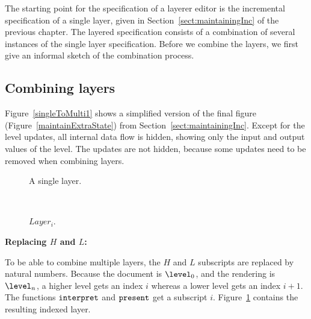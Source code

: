 The starting point for the specification of a layerer editor is the incremental specification of a single layer, given in Section~\ref{sect:maintainingInc} of the previous chapter. The layered specification consists of a combination of several instances of the single layer specification. Before we combine the layers, we first give an informal sketch of the combination process.

\subsection{Combining layers}

Figure~\ref{singleToMulti1} shows a simplified version of the final figure (Figure~\ref{maintainExtraState}) from Section~\ref{sect:maintainingInc}. Except for the level updates, all internal data flow is hidden, showing only the input and output values of the level. The updates are not hidden, because some updates need to be removed when combining layers.

\begin{figure}[h]
  \hfill
  \begin{minipage}[b]{.45\textwidth}
    \begin{center}  
      \caption{A single layer.} \label{singleToMulti1}
    \end{center}
  \end{minipage}
  \hfill
  \begin{minipage}[b]{.45\textwidth}
    \begin{center}  
      \\ \vspace{0.765cm}
      \caption{$Layer_i$.} \label{singleToMulti2}
    \end{center}
  \end{minipage}
  \hfill
\end{figure}

\bigskip
{\bf Replacing $H$ and $L$:}

To be able to combine multiple layers, the $H$ and $L$ subscripts are replaced by natural numbers. Because the document is $\level_0$, and the rendering is $\level_n$, a higher level gets an index $i$ whereas a lower level gets an index $i+1$. The functions ${\tt interpret}$ and ${\tt present}$ get a subscript $i$. Figure~\ref{singleToMulti2} contains the resulting indexed layer. 

